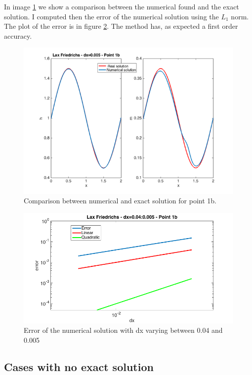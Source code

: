 \documentclass[oneside,12pt]{book}  %
\theoremstyle{plain}
\theoremstyle{definition}
\theoremstyle{remark}
\numberwithin{equation}{chapter} %
\begin{document}
In image \ref{img:lf_1b_solution} we show a comparison between the
numerical found and the exact solution. 
I computed then the error of the numerical solution using the $L_1$
norm. The plot of the error is in figure \ref{img:lf_1b_error}. The
method has, as expected a first order accuracy.
\begin{figure}[h]
\label{img:lf_1b_solution}
\centering
\includegraphics[scale=0.6]{Immagini/LF/1b-solution-2.png}
\caption{Comparison between numerical and exact solution for point
  1b.}
\end{figure}

\begin{figure}[h]
\label{img:lf_1b_error}
\centering
\includegraphics[scale=0.5]{Immagini/LF/1b-error.png}
\caption{Error of the numerical solution with dx varying between 0.04
  and 0.005}
\end{figure}

\subsection{Cases with no exact solution}
\label{subsection:1_c}
\end{document}
